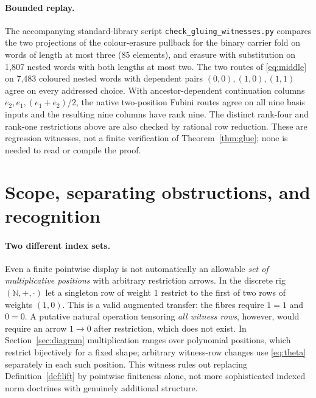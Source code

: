 \documentclass[11pt]{article}
\theoremstyle{definition}\newtheorem{definition}[theorem]{Definition}
\begin{document}
\paragraph{Bounded replay.}
The accompanying standard-library script
\texttt{check\_gluing\_witnesses.py} compares the two projections of
the colour-erasure pullback for the binary carrier fold on words of
length at most three (85 elements), and erasure with substitution on
1,807 nested words with both lengths at most two. The two routes of
\eqref{eq:middle} on 7,483 coloured nested words with dependent
pairs $(0,0),(1,0),(1,1)$ agree on every addressed choice.
With ancestor-dependent continuation columns $e_2,e_1,
(e_1+e_2)/2$, the native two-position Fubini routes agree on all
nine basis inputs and the resulting nine columns have rank nine.
The distinct rank-four and rank-one restrictions above are also
checked by rational row reduction. These are regression witnesses,
not a finite verification of Theorem~\ref{thm:glue}; none is needed
to read or compile the proof.

\section{Scope, separating obstructions, and recognition}\label{sec:boundary}
\paragraph{Two different index sets.}
Even a finite pointwise display is not automatically an allowable
\emph{set of multiplicative positions} with arbitrary restriction
arrows. In the discrete rig $(\mathbb N,+,\cdot)$ let a singleton
row of weight $1$ restrict to the first of two rows of weights
$(1,0)$. This is a valid augmented transfer: the fibres require
$1=1$ and $0=0$. A putative natural operation tensoring \emph{all
witness rows}, however, would require an arrow $1\to0$ after
restriction, which does not exist. In Section~\ref{sec:diagram}
multiplication ranges over polynomial positions, which restrict
bijectively for a fixed shape; arbitrary witness-row changes use
\eqref{eq:theta} separately in each such position. This witness rules
out replacing Definition~\ref{def:lift} by pointwise finiteness
alone, not more sophisticated indexed norm doctrines with genuinely
additional structure.
\end{document}
